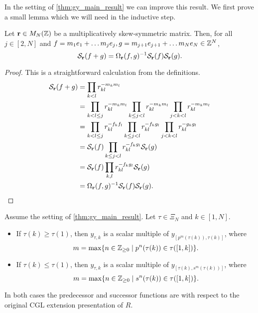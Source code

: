 In the setting of \cref{thm:gy_main_result} we can improve this result. We first prove
a small lemma which we will need in the inductive step.
\begin{lemma}\label{lem:symmetrization_of_sum}
	Let $\mathbf{r} \in M_N(\mathbb{Z})$ be a multiplicatively skew-symmetric matrix. Then, for all $j \in [2, N]$ and $f = m_1 e_1 + \dots m_j e_j, g = m_{j+1} e_{j+1} + \dots m_{N} e_N \in \mathbb{Z}^N$,
	\begin{equation*}
		\mathcal{S}_{\mathbf{r}}(f+g) = \Omega_{\mathbf{r}}(f,g)^{-1} \mathcal{S}_{\mathbf{r}}(f)\mathcal{S}_{\mathbf{r}}(g).
	\end{equation*}
\end{lemma}
\begin{proof}
	This is a straightforward calculation from the definitions.
	\begin{align*}
		\mathcal{S}_{\mathbf{r}}(f+g)
		 & = \prod_{k < l}r_{kl}^{-m_k m_l}                                                                                 \\
		 & = \prod_{k < l \leq j}r_{kl}^{-m_k m_l} \prod_{k \leq j < l}r_{kl}^{-m_k m_l} \prod_{j < k < l}r_{kl}^{-m_k m_l} \\
		 & = \prod_{k < l \leq j}r_{kl}^{-f_k f_l} \prod_{k \leq j < l}r_{kl}^{-f_k g_l} \prod_{j < k < l}r_{kl}^{-g_k g_l} \\
		 & = \mathcal{S}_{\mathbf{r}}(f) \prod_{k \leq j < l}r_{kl}^{-f_k g_l} \mathcal{S}_{\mathbf{r}}(g)                                            \\
		 & = \mathcal{S}_{\mathbf{r}}(f) \prod_{k, l}r_{kl}^{-f_k g_l} \mathcal{S}_{\mathbf{r}}(g)                                                    \\
		 & = \Omega_{\mathbf{r}}(f,g)^{-1} \mathcal{S}_{\mathbf{r}}(f) \mathcal{S}_{\mathbf{r}}(g).
	\end{align*}
\end{proof}
\begin{proposition}\label{prop:y_tau_is_y_bracket}
	Assume the setting of \cref{thm:gy_main_result}. Let $\tau \in \Xi_N$ and $k \in [1, N]$.
	\begin{itemize}
		\item If $\tau(k) \geq \tau(1)$, then $y_{\tau,k}$ is a scalar multiple of $y_{[p^m(\tau(k)),
							      \tau(k)]}$, where
		      \begin{equation*}
			      m = \max\{n \in \mathbb{Z}_{\geq 0} \mid p^n(\tau(k)) \in \tau([1,k])\}.
		      \end{equation*}
		\item If $\tau(k) \leq \tau(1)$, then $y_{\tau,k}$ is a scalar multiple of $y_{[\tau(k),s^m(
							      \tau(k))]}$, where
		      \begin{equation*}
			      m = \max\{n \in \mathbb{Z}_{\geq 0} \mid s^n(\tau(k)) \in \tau([1,k])\}.
		      \end{equation*}
	\end{itemize}
	In both cases the predecessor and successor functions are with respect to the original
	CGL extension presentation of $R$.
\end{proposition}
